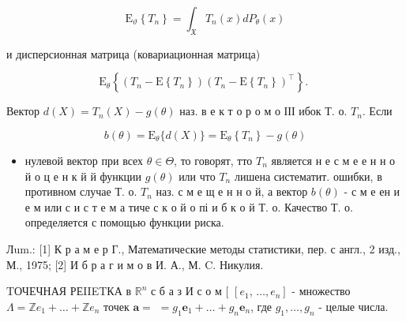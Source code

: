 \documentclass[10pt]{article}
\begin{document}
\[

\mathrm{E}_{\vartheta}\left\{T_{n}\right\}=\int_{\mathfrak{X}} T_{n}(x) d P_{\theta}(x)

\]



и дисперсионная матрица (ковариационная матрица)



\[

\mathrm{E}_{\theta}\left\{\left(T_{n}-\mathrm{E}\left\{T_{n}\right\}\right)\left(T_{n}-\mathrm{E}\left\{T_{n}\right\}\right)^{\top}\right\} \text {. }

\]



Вектор $d(X)=T_{n}(X)-g(\theta)$ наз. в е к т о р о м о ІІІ ибок Т. о. $T_{n}$. Если



\[

b(\theta)=\mathrm{E}_{\theta}\{d(X)\}=\mathrm{E}_{\theta}\left\{T_{n}\right\}-g(\theta)

\]



\begin{itemize}

  \item нулевой вектор при всех $\theta \in \Theta$, то говорят, тто $T_{n}$ является н е с м е е н н о й о ц е н к й й функции $g(\theta)$ или что $T_{n}$ лишена систематит. ошибки, в противном случае Т. о. $T_{n}$ наз. с м е щ е н н о й, а вектор $b(\theta)$ - с м е ен и е м или с и с т е м а тиче с к о й о пі и б к о й Т. о. Качество Т. о. определяется с помощью функции риска.

\end{itemize}



Лum.: [1] К р а м е р Г., Математические методы статистики, пер. с англ., 2 изд., М., 1975; [2] И б р а г и м о в И. А., М. C. Никулия.



TОЧЕЧНАЯ РЕIIETКА в $\mathbb{R}^{n}$ с б а з И с о м [ $\left[e_{1}\right.$, $\left.\ldots, e_{n}\right]$ - множество $\Lambda=\mathbb{Z} e_{1}+\ldots+\mathbb{Z} e_{n}$ точек $\boldsymbol{a}=$ $=g_{1} \boldsymbol{e}_{1}+\ldots+g_{n} \boldsymbol{e}_{n}$, где $g_{1}, \ldots, g_{n}$ - целые числа.
\end{document}

